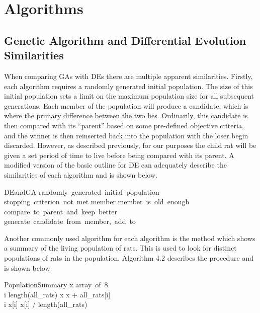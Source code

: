 \documentclass{sig-alternate}
\begin{document}
\section{Algorithms}
\label{sec:Algorithms}

\subsection{Genetic Algorithm and Differential Evolution Similarities}
When comparing GAs with DEs there are multiple apparent similarities.  Firstly, each algorithm requires a randomly generated initial population.  The size of this initial population sets a limit on the maximum population size for all subsequent generations.  Each member of the population will produce a candidate, which is where the primary difference between the two lies.  Ordinarily, this candidate is then compared with its ``parent'' based on some pre-defined objective criteria, and the winner is then reinserted back into the population with the loser begin discarded.  However, as described previously, for our purposes the child rat will be given a set period of time to live before being compared with its parent.  A modified version of the basic outline for DE can adequately describe the similarities of each algorithm and is shown below.\cite{DEMO}

\begin{pseudocode}{DEandGA}{ }
 \GETS \mbox{randomly generated initial population}\\
\WHILE \mbox{stopping criterion not met} \DO
\BEGIN
\FOREACH member \in {} \DO
\BEGIN
\IF \mbox{member is old enough}
\THEN \mbox{compare to parent and keep better}\\
\mbox{generate candidate from member, add to } 
\END
\END
\end{pseudocode}

Another commonly used algorithm for each algorithm is the method which shows a summary of the living population of rats.  This is used to look for distinct populations of rats in the population.  Algorithm 4.2 describes the procedure and is shown below.

\begin{pseudocode}{PopulationSummary}{ }
x \GETS \mbox{array of 8} \\
\FOR i  \TO length(all\_rats) \DO
x \GETS x + all\_rats[i]\\
\ENDFOR
\FOR i   \DO
x[i] \GETS x[i] / length(all\_rats)\\
\ENDFOR
{}
\label{alg:populationsummary}
\end{pseudocode}
\end{document}

